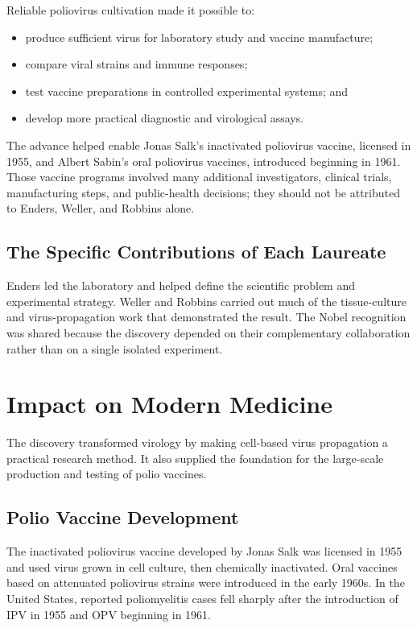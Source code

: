 Reliable poliovirus cultivation made it possible to:

\begin{itemize}
\item produce sufficient virus for laboratory study and vaccine manufacture;
\item compare viral strains and immune responses;
\item test vaccine preparations in controlled experimental systems; and
\item develop more practical diagnostic and virological assays.
\end{itemize}

The advance helped enable Jonas Salk's inactivated poliovirus vaccine, licensed in 1955, and Albert Sabin's oral poliovirus vaccines, introduced beginning in 1961. Those vaccine programs involved many additional investigators, clinical trials, manufacturing steps, and public-health decisions; they should not be attributed to Enders, Weller, and Robbins alone.

\subsection{The Specific Contributions of Each Laureate}

Enders led the laboratory and helped define the scientific problem and experimental strategy. Weller and Robbins carried out much of the tissue-culture and virus-propagation work that demonstrated the result. The Nobel recognition was shared because the discovery depended on their complementary collaboration rather than on a single isolated experiment.

\section{Impact on Modern Medicine}

The discovery transformed virology by making cell-based virus propagation a practical research method. It also supplied the foundation for the large-scale production and testing of polio vaccines.

\subsection{Polio Vaccine Development}

The inactivated poliovirus vaccine developed by Jonas Salk was licensed in 1955 and used virus grown in cell culture, then chemically inactivated. Oral vaccines based on attenuated poliovirus strains were introduced in the early 1960s. In the United States, reported poliomyelitis cases fell sharply after the introduction of IPV in 1955 and OPV beginning in 1961.

